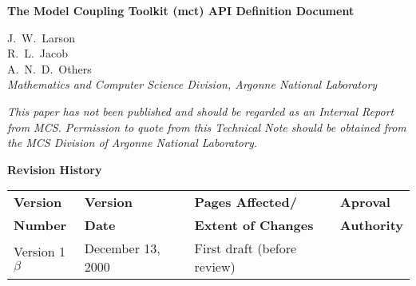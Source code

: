 \documentclass{article}
\begin{document}
\begin{sloppypar}
{\huge\bf
The Model Coupling Toolkit (mct) API Definition Document
\\ }                     %
\end{sloppypar}

\vspace{.3in}
             J.~W.~Larson\\
             R.~L.~Jacob\\
             A.~N.~D.~Others\\
\vspace{.2in} {\em Mathematics and Computer Science Division,
Argonne National Laboratory\\}

\vfill

{\em This paper has not been published and should  be regarded as
an Internal Report from MCS. Permission to quote from this
Technical Note should be  obtained from the MCS Division of
Argonne National Laboratory.}

\vspace{0.4in}


\thispagestyle{empty}
\newpage




\newpage
\setcounter{page}{2}     %


\vspace*{\fill}

\centerline{\huge\bf Revision History}

\bigskip
{}

\begin{center}
\begin{tabular}{|l|l|l|l|}\hline
{\bf Version} & {\bf Version} & {\bf Pages Affected/}   & {\bf Aproval}\\
{\bf Number}  & {\bf Date}    & {\bf Extent of Changes} & {\bf Authority}\\
\hline\hline Version 1$\beta$ & December 13, 2000      & First
draft (before review) &\\\hline
\end{tabular}
\end{center}
\end{document}
